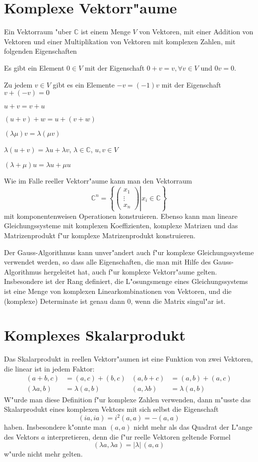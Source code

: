 \section{Komplexe Vektorr"aume}
Ein Vektorraum "uber $\mathbb C$ ist einem Menge $V$ von Vektoren, mit
einer Addition von Vektoren und einer Multiplikation von Vektoren mit
komplexen Zahlen, mit folgenden Eigenschaften
\begin{compactenum}
\item Es gibt ein Element $0\in V$ mit der Eigenschaft $0+v=v,\forall v\in V$
und $0v=0$.
\item Zu jedem $v\in V$ gibt es ein Elemente $-v=(-1)v$ mit der Eigenschaft
$v+(-v)=0$
\item $u+v=v+u$
\item $(u+v)+w=u+(v+w)$
\item $(\lambda\mu)v=\lambda (\mu v)$
\item $\lambda(u+v)=\lambda u+ \lambda v$, $\lambda\in\mathbb C$, $u,v\in V$
\item $(\lambda+\mu)u=\lambda u+\mu u$
\end{compactenum}
Wie im Falle reeller Vektorr"aume kann man den Vektorraum
\[
{\mathbb C}^n = \left\{\left .
\begin{pmatrix}x_1\\\vdots\\x_n\end{pmatrix}
\right|
x_i\in\mathbb C
\right\}
\]
mit komponentenweisen Operationen konstruieren.
Ebenso kann man lineare Gleichungssysteme mit komplexen Koeffizienten,
komplexe Matrizen und das Matrizenprodukt f"ur komplexe Matrizenprodukt
konstruieren.

Der Gauss-Algorithmus kann unver"andert auch f"ur komplexe Gleichungssysteme
verwendet werden, so dass alle Eigenschaften, die man mit Hilfe des
Gauss-Algorithmus hergeleitet hat, auch f"ur komplexe Vektorr"aume
gelten.
Insbesondere ist der Rang definiert, die L"osungsmenge
eines Gleichungssystems ist eine Menge von komplexen Linearkombinationen
von Vektoren, und die (komplexe) Determinate ist genau dann 0, wenn
die Matrix singul"ar ist.

\section{Komplexes Skalarprodukt}
Das Skalarprodukt in reellen Vektorr"aumen ist eine Funktion von
zwei Vektoren, die linear ist in jedem Faktor:
\begin{align*}
(a+b,c)&=(a,c)+(b,c)&(a,b+c)&=(a,b)+(a,c)\\
(\lambda a,b)&=\lambda(a,b)&(a,\lambda b)&=\lambda(a,b)
\end{align*}
W"urde man diese Definition f"ur komplexe Zahlen verwenden, dann
m"usste das Skalarprodukt eines komplexen Vektors mit sich selbst
die Eigenschaft 
\[
(ia,ia)=i^2(a,a)=-(a,a)
\]
haben. Insbesondere k"onnte man $(a,a)$ nicht mehr als das Quadrat der
L"ange des Vektors $a$ interpretieren, denn die f"ur reelle Vektoren
geltende Formel
\[
(\lambda a,\lambda a)=|\lambda |\, (a,a)
\]
w"urde nicht mehr gelten.

